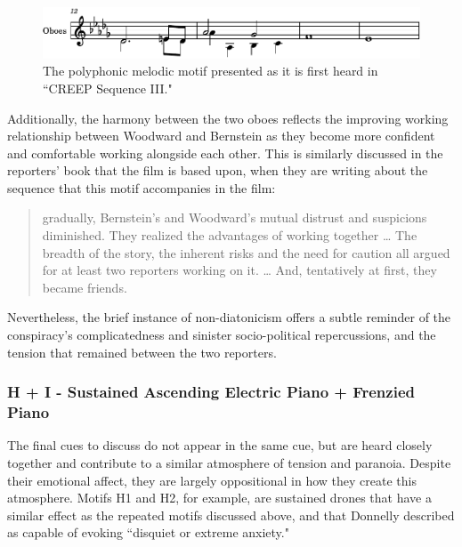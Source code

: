 \begin{figure}
    \centering
    \includegraphics[width=1\linewidth]{img/president-intertwining.pdf}
    \caption{The polyphonic melodic motif presented as it is first heard in ``CREEP Sequence III."}
    \label{fig:president-intertwining}
\end{figure}

Additionally, the harmony between the two oboes reflects the improving working relationship between Woodward and Bernstein as they become more confident and comfortable working alongside each other.
This is similarly discussed in the reporters' book that the film is based upon, when they are writing about the sequence that this motif accompanies in the film:
\begin{quote}
gradually, Bernstein’s and Woodward’s mutual distrust and suspicions diminished. They realized the advantages of working together … The breadth of the story, the inherent risks and the need for caution all argued for at least two reporters working on it. … And, tentatively at first, they became friends.\autocites[While the book was written by the two reporters, it is written in the third person.][49-51]{woodward_all_1974}
\end{quote}
Nevertheless, the brief instance of non-diatonicism offers a subtle reminder of the conspiracy's complicatedness and sinister socio-political repercussions, and the tension that remained between the two reporters.





\subsubsection{H + I - Sustained Ascending Electric Piano + Frenzied Piano
}
The final cues to discuss do not appear in the same cue, but are heard closely together and contribute to a similar atmosphere of tension and paranoia.
Despite their emotional affect, they are largely oppositional in how they create this atmosphere.
Motifs H1 and H2, for example, are sustained drones that have a similar effect as the repeated motifs discussed above, and that Donnelly described as capable of evoking ``disquiet or extreme anxiety."\autocites[][161]{donnelly_hearing_2010}

